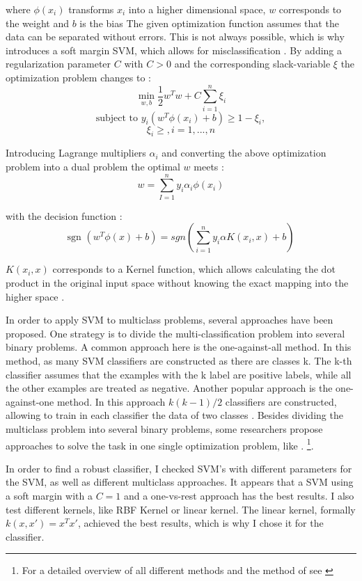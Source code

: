 \documentclass[12pt, a4paper, titlepage]{article}
\begin{document}
where $\phi(x_i)$ transforms $x_i$ into a higher dimensional space, $w$ corresponds to the weight and $b$ is the bias \citep{Chang2001,Jordan2006}
The given optimization function assumes that the data can be separated without errors. This is not always possible, which is why \cite{Cortes1995} introduces a soft margin \ac{SVM}, which allows for misclassification \citep{Vapnik2000}.
By adding a regularization parameter $C$ with $C > 0$ and the corresponding slack-variable $\xi$ the optimization problem changes to \citep{Chang2001, Han2012}: 
\[\min_{w,b} \frac{1}{2}w^{T}w + C \sum_{i=1}^n \xi_i \] 
\[\text{subject to } y_i(w^T\phi(x_i)+b) \geq 1 - \xi_i, \] 
\[\xi_i \geq, i = 1,...,n\]

Introducing Lagrange multipliers $\alpha_i$ and converting the above optimization problem into a dual problem the optimal $w$ meets \citep{Chang2001, Jordan2006}:
\[w = \sum_{I=1}^n y_i\alpha_i\phi(x_i)\]

with the decision function \citep{Chang2001}:
\[\text{sgn } (w^T\phi(x)+b) = sgn(\sum_{i=1}^n y_i \alpha K(x_i, x) +b)\]

$K(x_i, x)$ corresponds to a Kernel function, which allows calculating the dot product in the original input space without knowing the exact mapping into the higher space \citep{Han2012, Jordan2006}. 

In order to apply \ac{SVM} to multiclass problems, several approaches have been proposed. One strategy is to divide the multi-classification problem into several binary problems. A common approach here is the one-against-all method. In this method, as many \ac{SVM} classifiers are constructed as there are classes k. The k-th classifier assumes that the examples with the k label are positive labels, while all the other examples are treated as negative. Another popular approach is the one-against-one method. In this approach $k(k-1)/2$ classifiers are constructed, allowing to train in each classifier the data of two classes \citep{Hsu2002}. Besides dividing the multiclass problem into several binary problems, some researchers propose approaches to solve the task in one single optimization problem, like \citet{Crammer2001}. \footnote{For a detailed overview of all different methods and the method of \citet{Crammer2001} see \citet{Hsu2002,Crammer2001}}. 

In order to find a robust classifier, I checked \ac{SVM}'s with different parameters for the \ac{SVM}, as well as different multiclass approaches. It appears that a \ac{SVM} using a soft margin with a $C=1$ and a one-vs-rest approach has the best results. I also test different kernels, like  RBF Kernel or linear kernel. The linear kernel, formally  $k(x, x') = x^Tx'$, achieved the best results, which is why I chose it for the classifier. 
\end{document}
